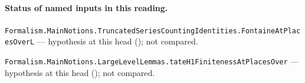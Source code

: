 

\paragraph{Status of named inputs in this reading.}
\noindent\nolinkurl{Formalism.MainNotions.TruncatedSeriesCountingIdentities.FontaineAtPlacesOverL} --- hypothesis at this head (); not compared.\par
\noindent\nolinkurl{Formalism.MainNotions.LargeLevelLemmas.tateH1FinitenessAtPlacesOver} --- hypothesis at this head (); not compared.\par


